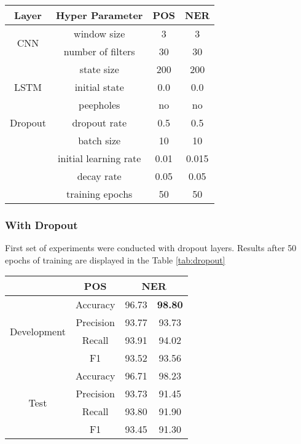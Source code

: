 \begin{center}
\begin{tabular}{ |c|c|c|c| }
\hline
\textbf{Layer} & \textbf{Hyper Parameter} & \textbf{POS} & \textbf{NER} \\ \hline
\multirow{2}{*}{CNN} & window size & 3 & 3 \\
 & number of filters & 30 & 30 \\ \hline
\multirow{3}{*}{LSTM} & state size & 200 & 200 \\
 & initial state & 0.0 & 0.0 \\
 & peepholes & no & no \\ \hline
Dropout & dropout rate & 0.5 & 0.5 \\ \hline
\multirow{2}{*}{} & batch size & 10 & 10\\
 & initial learning rate & 0.01 & 0.015 \\
 & decay rate & 0.05 & 0.05 \\
 & training epochs & 50 & 50 \\
\hline
\end{tabular}
\label{tab:hyper}
\end{center}

\label{no_dropout}
\subsubsection{With Dropout}
First set of experiments were conducted with dropout layers. Results after 50
epochs of training are displayed in the Table \ref{tab:dropout}

\begin{center}
\begin{tabular}{ |c|c|c|c| }
\hline
& {\textbf{POS}} & \multicolumn{2}{|c|}{\textbf{NER}}\\ \hline
\multirow{4}{*}{Development} & Accuracy & 96.73 & \textbf{98.80} \\
 & Precision & 93.77 & 93.73 \\
 & Recall & 93.91 & 94.02 \\
 & F1 & 93.52 & 93.56 \\ \hline
\multirow{4}{*}{Test} & Accuracy & 96.71 & 98.23 \\
 & Precision & 93.73 & 91.45 \\
 & Recall & 93.80 & 91.90 \\
 & F1 & 93.45 & 91.30 \\ \hline
\end{tabular}
\label{tab:dropout}
\end{center}

